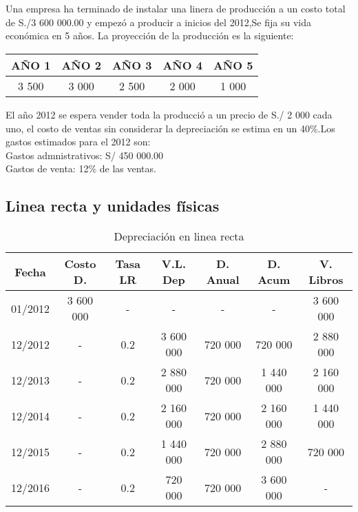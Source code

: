\documentclass[10pt,a4paper]{report}
\author{\Lain}
\begin{document}
\chapter{}
Una empresa ha terminado de instalar una linera de producción a un costo total de S./3 600 000.00 y empezó a producir a inicios del 2012,Se fija su vida económica en 5 años. La proyección de la producción es la siguiente:\\
	
	\begin{tabular}{|c|c|c|c|c|} \hline
	AÑO 1 & AÑO 2 & AÑO 3 & AÑO 4 & AÑO 5 \\ \hline
	3 500 & 3 000 & 2 500 & 2 000 & 1 000 \\ \hline
	\end{tabular}
	
	El año 2012 se espera vender toda la producció a un precio de S./ 2 000 cada uno, el costo de ventas sin considerar la depreciación se estima en un 40\%.Los gastos estimados para el 2012 son:\\
	Gastos admnistrativos: S/ 450 000.00\\
	Gastos de venta: 12\% de las ventas.\\
	\section{Linea recta y unidades físicas}

	
	\begin{table}[h]
	\centering
	\caption{Depreciación en linea recta}	
	
	\begin{tabular}{|c|c|c|c|c|c|c|} \hline
	
	Fecha   & Costo D.  & Tasa LR & V.L. Dep  & D. Anual & D. Acum   & V. Libros \\  \hline

	01/2012 & 3 600 000 & -       & -         & -        & -         & 3 600 000 \\  \hline

	12/2012 & -         & 0.2     & 3 600 000 & 720 000  & 720 000   & 2 880 000 \\  \hline

	12/2013 & -         & 0.2     & 2 880 000 & 720 000  & 1 440 000 & 2 160 000 \\  \hline

	12/2014 & -         & 0.2     & 2 160 000 & 720 000  & 2 160 000 & 1 440 000 \\  \hline

	12/2015 & -         & 0.2     & 1 440 000 & 720 000  & 2 880 000 & 720 000   \\  \hline

	12/2016 & -         & 0.2     & 720 000   & 720 000  & 3 600 000 & -         \\  \hline
	\end{tabular}
	\end{table}
	
\end{document}
